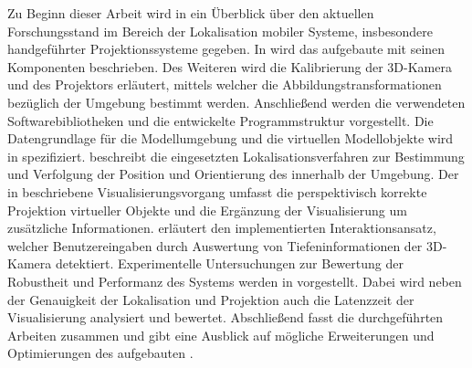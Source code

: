Zu Beginn dieser Arbeit wird in  ein Überblick über den aktuellen Forschungsstand im Bereich der Lokalisation mobiler Systeme, insbesondere handgeführter Projektionssysteme gegeben. In  wird das aufgebaute \kps{} mit seinen Komponenten beschrieben. Des Weiteren wird die Kalibrierung der 3D-Kamera und des Projektors erläutert, mittels welcher die Abbildungstransformationen bezüglich der Umgebung bestimmt werden. Anschließend werden die verwendeten Softwarebibliotheken und die entwickelte Programmstruktur vorgestellt. Die Datengrundlage für die Modellumgebung und die virtuellen Modellobjekte wird in  spezifiziert.  beschreibt die eingesetzten Lokalisationsverfahren zur Bestimmung und Verfolgung der Position und Orientierung des  innerhalb der Umgebung. Der in  beschriebene Visualisierungsvorgang umfasst die perspektivisch korrekte Projektion virtueller Objekte und die Ergänzung der Visualisierung um zusätzliche Informationen.  erläutert den implementierten Interaktionsansatz, welcher Benutzereingaben durch Auswertung von Tiefeninformationen der 3D-Kamera detektiert. Experimentelle Untersuchungen zur Bewertung der Robustheit und Performanz des Systems werden in  vorgestellt. Dabei wird neben der Genauigkeit der Lokalisation und Projektion auch die Latenzzeit der Visualisierung analysiert und bewertet. Abschließend fasst  die durchgeführten Arbeiten zusammen und gibt eine Ausblick auf mögliche Erweiterungen und Optimierungen des aufgebauten .

